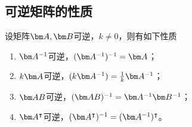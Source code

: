 \subsection{可逆矩阵的性质}\label{sec:可逆矩阵的性质}
设矩阵$\mat{A},\mat{B}$可逆，$k\neq 0$，则有如下性质
\begin{enumerate}[(1)]
    \item $\mat{A}^{-1}$可逆，$(\mat{A}^{-1})^{-1} = \mat{A}$；
    \item $k\mat{A}$可逆，$(k\mat{A}^{-1}) = \frac{1}{k} \mat{A}^{-1}$；
    \item $\mat{AB}$可逆，$(\mat{AB})^{-1} = \mat{A}^{-1}\mat{B}^{-1}$；
    \item $\mat{A}^\intercal$可逆，$(\mat{A}^\intercal)^{-1} = (\mat{A}^{-1})^\intercal$。
\end{enumerate}

\pagebreak
